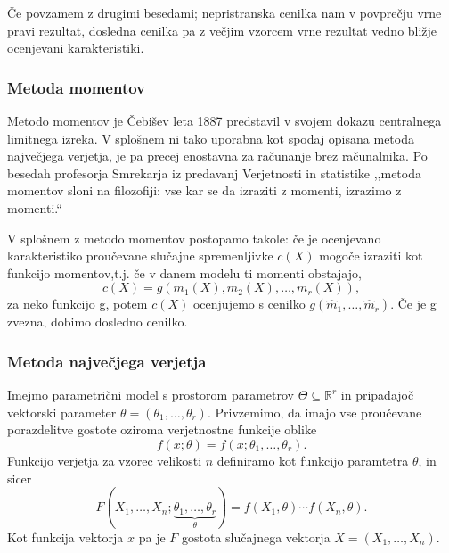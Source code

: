 \documentclass[12pt,a4paper]{amsart}
\theoremstyle{definition} %
\theoremstyle{plain} %
\begin{document}
Če povzamem z drugimi besedami; nepristranska cenilka nam v povprečju vrne pravi rezultat, dosledna cenilka pa z večjim vzorcem vrne rezultat vedno
bližje ocenjevani karakteristiki.

\subsubsection{Metoda momentov}
Metodo momentov je Čebišev leta 1887 predstavil v svojem dokazu centralnega limitnega izreka. V splošnem ni tako uporabna kot spodaj opisana metoda največjega
verjetja, je pa precej enostavna za računanje brez računalnika. Po besedah profesorja Smrekarja iz predavanj Verjetnosti in statistike\:
,,metoda momentov sloni na filozofiji: vse kar se da izraziti z momenti, izrazimo z momenti.``

V splošnem z metodo momentov postopamo takole: če je ocenjevano karakteristiko proučevane slučajne spremenljivke $c(X)$ mogoče izraziti kot funkcijo 
momentov,t.j. če v danem modelu ti momenti obstajajo, 
\[
    c(X) = g(m_{1}(X), m_{2}(X),\ldots,m_{r}(X)),
\] za neko funkcijo g, potem $c(X)$ ocenjujemo s cenilko $g(\hat{m}_{1},\ldots,\hat{m}_{r}).$ Če je g zvezna, dobimo dosledno cenilko.

\subsubsection{Metoda največjega verjetja}
Imejmo parametrični model s prostorom parametrov $\Theta \subseteq \mathbb{R}^{r}$ in pripadajoč vektorski parameter $\theta = (\theta_{1},\ldots,\theta_{r}).$
Privzemimo, da imajo vse proučevane porazdelitve gostote oziroma verjetnostne funkcije oblike
\[
    f(x;\theta) = f(x;\theta_{1},\ldots,\theta_{r}).
\]
Funkcijo verjetja za vzorec velikosti $n$ definiramo kot funkcijo paramtetra $\theta$, in sicer
\[
    F(X_{1},\ldots,X_{n};\underbrace{\theta_{1},\ldots,\theta_{r}}_{\theta}) = f(X_{1},\theta)\cdots f(X_{n},\theta).
\]
Kot funkcija vektorja $x$ pa je $F$ gostota slučajnega vektorja $X = (X_{1},\ldots,X_{n}).$
\end{document}
